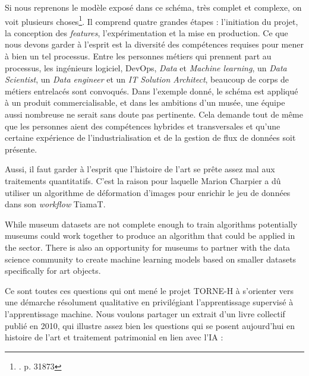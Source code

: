Si nous reprenons le modèle exposé dans ce schéma, très complet et complexe, on voit plusieurs choses\footnote{\cite{kreuzberger_machine_2023}. p. 31873}. Il comprend quatre grandes étapes : l'initiation du projet, la conception des \textit{features}, l'expérimentation et la mise en production. Ce que nous devons garder à l'esprit est la diversité des compétences requises pour mener à bien un tel processus. Entre les personnes métiers qui prennent part au processus, les ingénieurs logiciel, DevOps, \textit{Data} et \textit{Machine learning}, un \textit{Data Scientist}, un \textit{Data engineer} et un \textit{IT Solution Architect}, beaucoup de corps de métiers entrelacés sont convoqués. Dans l'exemple donné, le schéma est appliqué à un produit commercialisable, et dans les ambitions d'un musée, une équipe aussi nombreuse ne serait sans doute pas pertinente. Cela demande tout de même que les personnes aient des compétences hybrides et transversales et qu'une certaine expérience de l'industrialisation et de la gestion de flux de données soit présente.

Aussi, il faut garder à l'esprit que l'histoire de l'art se prête assez mal aux traitements quantitatifs. C'est la raison pour laquelle Marion Charpier a dû utiliser un algorithme de déformation d'images pour enrichir le jeu de données dans son \textit{workflow} TiamaT.

\vspace{1em}
\noindent
\hspace*{1cm}
\begin{minipage}{\dimexpr\linewidth-2cm}
\fontsize{10}{12}\selectfont
While museum datasets are not complete enough to train algorithms potentially museums could work together to produce an algorithm that could be applied in the sector. There is also an opportunity for museums to partner with the data science community to create machine learning models based on smaller datasets specifically for art objects.                                                  \footnotemark{}
\end{minipage}
\vspace{1em}

Ce sont toutes ces questions qui ont mené le projet TORNE-H à s'orienter vers une démarche résolument qualitative en privilégiant l'apprentissage supervisé à l'apprentissage machine. Nous voulons partager un extrait d'un livre collectif publié en 2010, qui illustre assez bien les questions qui se posent aujourd'hui en histoire de l'art et traitement patrimonial en lien avec l'IA : 

